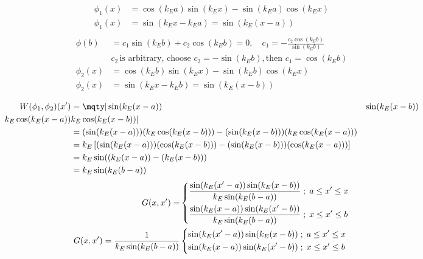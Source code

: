 \documentclass{article}
\begin{document}
{\begin{enumerate}
\begin{equation*}
\begin{split}
				\phi_1(x) &= \cos (k_E a) \sin (k_E x) - \sin (k_E a) \cos (k_E x) \\
				\phi_1(x) &= \sin(k_E x - k_E a) = \sin(k_E (x - a)) \\
			\end{split}
		\end{equation*}
		\begin{equation*}
			\begin{split}
				\phi(b) &= c_1 \sin (k_E b) + c_2 \cos (k_E b) = 0, \quad c_1 = -\frac{c_2 \cos (k_E b)}{\sin (k_E b)} \\
				&c_2 \, \text{is arbitrary, choose } c_2 = -\sin (k_E b), \text{then } c_1 = \cos (k_E b) \\
				\phi_2(x) &= \cos (k_E b) \sin (k_E x) - \sin (k_E b) \cos (k_E x) \\
				\phi_2(x) &= \sin(k_E x - k_E b) = \sin(k_E (x - b)) \\
			\end{split}
		\end{equation*}
		\begin{equation*}
			\begin{split}
				W(\phi_1 , \phi_2)(x') &=
				\mqty| \sin(k_E (x - a)) & \sin(k_E (x - b)) \\ 
				k_E \cos(k_E (x - a))    & k_E \cos(k_E (x - b)) | \\
				&= (\sin(k_E (x - a)))(k_E \cos(k_E (x - b))) - (\sin(k_E (x - b)))(k_E \cos(k_E (x - a))) \\
				&= k_E \left[ (\sin(k_E (x - a)))(\cos(k_E (x - b))) - (\sin(k_E (x - b)))(\cos(k_E (x - a))) \right] \\
				&= k_E \sin((k_E (x - a))-(k_E (x - b))) \\
				&= k_E \sin( k_E (b - a) )
			\end{split}
		\end{equation*}
		\begin{equation*}
			\begin{split}
				G(x,x') =
				&\begin{dcases}
					\frac{\sin(k_E (x' - a)) \sin(k_E (x - b))}{k_E \sin( k_E (b - a) )} \; ; \; a \leq x' \leq x \\
					\frac{\sin(k_E (x - a)) \sin(k_E (x' - b))}{k_E \sin( k_E (b - a) )} \; ; \; x \leq x' \leq b 
				\end{dcases} \\
			G(x,x') = \frac{1}{k_E \sin( k_E (b - a) )}
				&\begin{dcases}
					\sin(k_E (x' - a)) \sin(k_E (x - b)) \; ; \; a \leq x' \leq x \\
					\sin(k_E (x - a)) \sin(k_E (x' - b)) \; ; \; x \leq x' \leq b
				\end{dcases}
			\end{split}
		\end{equation*}
		

\end{enumerate}}
\end{document}
